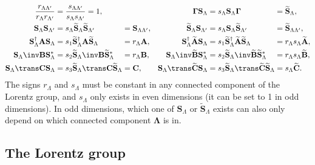 \documentclass[11pt]{article}
\newcommand{\Gammab}{\boldsymbol{\Gamma}}
\renewcommand{\S}{\mathbf{S}}
\newcommand{\A}{\mathbf{A}}
\newcommand{\B}{\mathbf{B}}
\renewcommand{\C}{\mathbf{C}}
\newcommand{\At}{\widetilde{\A}}
\newcommand{\Bt}{\widetilde{\B}}
\newcommand{\Ct}{\widetilde{\C}}
\newcommand{\St}{\widetilde{\S}}
\newcommand{\Lambdab}{\boldsymbol{\Lambda}}
\begin{document}
\begin{equation}\label{eq:constnormlorentz}
\begin{alignedat}{4}
  \frac{r_{\Lambda\Lambda'}}{r_{\Lambda} r_{\Lambda'}}
    &= \frac{s_{\Lambda\Lambda'}}{s_{\Lambda} s_{\Lambda'}} 
    = 1, &&&
  \Gammab \S_\Lambda 
    &= s_\Lambda \S_\Lambda \Gammab &
    &= \St_\Lambda, \\
  \S_\Lambda \S_{\Lambda'} 
    &= s_{\Lambda} \St_\Lambda \St_{\Lambda'} &
    &= \S_{\Lambda\Lambda'}, &
  \St_\Lambda \S_{\Lambda'}
    &= s_{\Lambda} \S_\Lambda \St_{\Lambda'} &
    &= \St_{\Lambda\Lambda'}, \\ 
  \S_\Lambda^\dag \A \S_\Lambda 
    &= s_1 \St_\Lambda^\dag \A \St_\Lambda &
    &= r_\Lambda \A, &
  \S_\Lambda^\dag \At \S_\Lambda 
    &= s_1 \St_\Lambda^\dag \At \St_\Lambda &
    &= r_\Lambda s_\Lambda \At, \\
  \S_\Lambda\inv \B \S_\Lambda^\ast 
    &= s_2 \St_\Lambda\inv \B \St_\Lambda^\ast &
    &= r_\Lambda \B, &\qquad
  \S_\Lambda\inv \Bt \S_\Lambda^\ast 
    &= s_2 \St_\Lambda\inv \Bt \St_\Lambda^\ast &
    &= r_\Lambda s_\Lambda \Bt, \\ 
  \S_\Lambda\trans \C \S_\Lambda 
    &= s_3 \St_\Lambda\trans \C \St_\Lambda &
    &= \C, & 
  \S_\Lambda\trans \Ct \S_\Lambda 
    &= s_3 \St_\Lambda\trans \Ct \St_\Lambda &
    &= s_\Lambda \Ct. 
\end{alignedat}
\end{equation}
%
The signs \(r_\Lambda\) and \(s_\Lambda\) must be constant in any connected component of the Lorentz group,
and \(s_\Lambda\) only exists in even dimensions 
(it can be set to 1 in odd dimensions).
In odd dimensions, which one of \(\S_\Lambda\) or \(\St_\Lambda\) exists can also only depend on which connected component \(\Lambdab\) is in.
  

\subsection{The Lorentz group}\label{sec:group}
\end{document}
